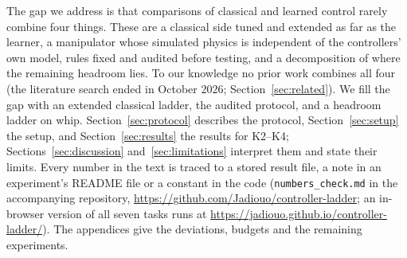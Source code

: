 The gap we address is that comparisons of classical and learned control rarely combine four things. These are a classical side tuned and extended as far as the learner, a manipulator whose simulated physics is independent of the controllers' own model, rules fixed and audited before testing, and a decomposition of where the remaining headroom lies. To our knowledge no prior work combines all four (the literature search ended in October 2026; Section~\ref{sec:related}). We fill the gap with an extended classical ladder, the audited protocol, and a headroom ladder on whip. Section~\ref{sec:protocol} describes the protocol, Section~\ref{sec:setup} the setup, and Section~\ref{sec:results} the results for K2--K4; Sections~\ref{sec:discussion} and~\ref{sec:limitations} interpret them and state their limits. Every number in the text is traced to a stored result file, a note in an experiment's README file or a constant in the code (\texttt{numbers\_check.md} in the accompanying repository, \url{https://github.com/Jadiouo/controller-ladder}; an in-browser version of all seven tasks runs at \url{https://jadiouo.github.io/controller-ladder/}). The appendices give the deviations, budgets and the remaining experiments.
